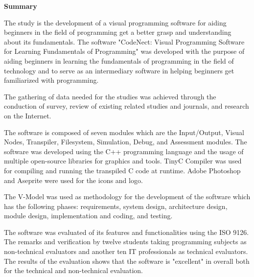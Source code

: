 \flushleft
\textbf{Summary}
\justifying

\parx
The study is the development of a visual programming software for aiding
beginners in the field of programming get a better grasp and understanding
about its fundamentals.  The software "CodeNect: Visual Programming Software
for Learning Fundamentals of Programming" was developed with the purpose of
aiding beginners in learning the fundamentals of programming in the field of
technology and to serve as an intermediary software in helping beginners get
familiarized with programming.

\parx
The gathering of data needed for the studies was achieved through the
conduction of survey, review of existing related studies and journals, and
research on the Internet.

\parx
The software is composed of seven modules which are the Input/Output, Visual
Nodes, Transpiler, Filesystem, Simulation, Debug, and Assessment modules. The
software was developed using the C++ programming language and the usage of
multiple open-source libraries for graphics and tools. TinyC Compiler was used
for compiling and running the transpiled C code at runtime. Adobe Photoshop
and Aseprite were used for the icons and logo.

\parx
The V-Model was used as methodology for the development of the software which
has the following phases: requirements, system design, architecture design, module
design, implementation and coding, and testing.

\parx
The software was evaluated of its features and functionalities using the ISO
9126. The remarks and verification by twelve students taking programming
subjects as non-technical evaluators and another ten IT professionals as technical
evaluators. The results of the evaluation shows that the software is "excellent"
in overall both for the technical and non-technical evaluation.
